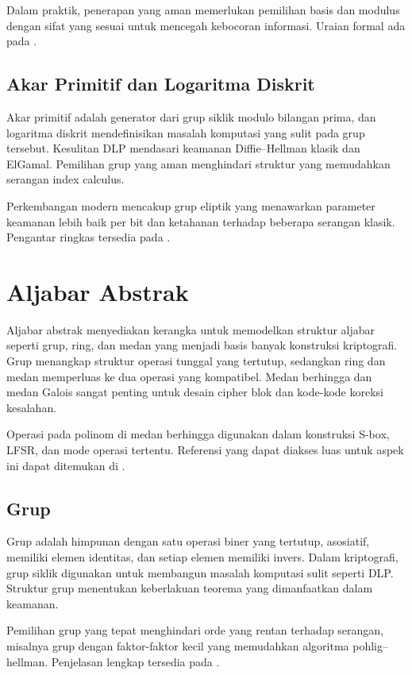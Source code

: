 \documentclass[../main.tex]{subfiles}
\begin{document}
Dalam praktik, penerapan yang aman memerlukan pemilihan basis dan modulus dengan sifat yang sesuai untuk mencegah kebocoran informasi. Uraian formal ada pada \textcite{menezes1996handbook}.

\subsection{Akar Primitif dan Logaritma Diskrit}
Akar primitif adalah generator dari grup siklik modulo bilangan prima, dan logaritma diskrit mendefinisikan masalah komputasi yang sulit pada grup tersebut. Kesulitan DLP mendasari keamanan Diffie--Hellman klasik dan ElGamal. Pemilihan grup yang aman menghindari struktur yang memudahkan serangan index calculus.

Perkembangan modern mencakup grup eliptik yang menawarkan parameter keamanan lebih baik per bit dan ketahanan terhadap beberapa serangan klasik. Pengantar ringkas tersedia pada \textcite{menezes1996handbook,bonehshoup2020}.

\section{Aljabar Abstrak}
Aljabar abstrak menyediakan kerangka untuk memodelkan struktur aljabar seperti grup, ring, dan medan yang menjadi basis banyak konstruksi kriptografi. Grup menangkap struktur operasi tunggal yang tertutup, sedangkan ring dan medan memperluas ke dua operasi yang kompatibel. Medan berhingga dan medan Galois sangat penting untuk desain cipher blok dan kode-kode koreksi kesalahan.

Operasi pada polinom di medan berhingga digunakan dalam konstruksi S-box, LFSR, dan mode operasi tertentu. Referensi yang dapat diakses luas untuk aspek ini dapat ditemukan di \textcite{menezes1996handbook}.

\subsection{Grup}
Grup adalah himpunan dengan satu operasi biner yang tertutup, asosiatif, memiliki elemen identitas, dan setiap elemen memiliki invers. Dalam kriptografi, grup siklik digunakan untuk membangun masalah komputasi sulit seperti DLP. Struktur grup menentukan keberlakuan teorema yang dimanfaatkan dalam keamanan.

Pemilihan grup yang tepat menghindari orde yang rentan terhadap serangan, misalnya grup dengan faktor-faktor kecil yang memudahkan algoritma pohlig–hellman. Penjelasan lengkap tersedia pada \textcite{menezes1996handbook}.
\end{document}
